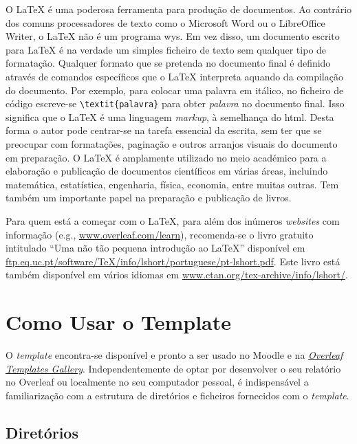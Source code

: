 O \LaTeX{} é uma poderosa ferramenta para produção de documentos. Ao contrário dos comuns processadores de texto como o Microsoft Word ou o LibreOffice Writer, o \LaTeX{} não é um programa \ac{wys}. Em vez disso, um documento escrito para \LaTeX{} é na verdade um simples ficheiro de texto sem qualquer tipo de formatação. Qualquer formato que se pretenda no documento final é definido através de comandos específicos que o \LaTeX{} interpreta aquando da compilação do documento. Por exemplo, para colocar uma palavra em itálico, no ficheiro de código escreve-se \verb|\textit{palavra}| para obter \textit{palavra} no documento final. Isso significa que o \LaTeX{} é uma linguagem \emph{markup}, à semelhança do \ac{html}. Desta forma o autor pode centrar-se na tarefa essencial da escrita, sem ter que se preocupar com formatações, paginação e outros arranjos visuais do documento em preparação. O \LaTeX{} é amplamente utilizado no meio académico para a elaboração e publicação de documentos científicos em várias áreas, incluindo matemática, estatística, engenharia, física, economia, entre muitas outras. Tem também um importante papel na preparação e publicação de livros.

Para quem está a começar com o \LaTeX{}, para além dos inúmeros \textit{websites} com informação (e.g., \url{www.overleaf.com/learn}), recomenda-se o livro gratuito intitulado ``Uma não tão pequena introdução ao \LaTeX{}'' disponível em \url{ftp.eq.uc.pt/software/TeX/info/lshort/portuguese/pt-lshort.pdf}. Este livro está também disponível em vários idiomas em \url{www.ctan.org/tex-archive/info/lshort/}.


\section{Como Usar o Template}

O \textit{template} encontra-se disponível e pronto a ser usado no Moodle e na \href{https://www.overleaf.com/latex/templates/isep-dee-bsc-latex-template/kqkmqnjbbpvj}{\textit{Overleaf Templates Gallery}}. Independentemente de optar por desenvolver o seu relatório no Overleaf ou localmente no seu computador pessoal, é indispensável a familiarização com a estrutura de diretórios e ficheiros fornecidos com o \textit{template}.

\subsection{Diretórios}


